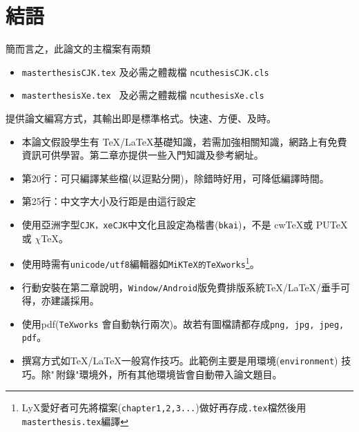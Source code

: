 \section{結語}
簡而言之，此論文的主檔案有兩類
\begin{itemize}
\item {\tt masterthesisCJK.tex} 及必需之體裁檔 {\tt ncuthesisCJK.cls}
\item {\tt masterthesisXe.tex } 及必需之體裁檔 {\tt ncuthesisXe.cls}
\end{itemize}
提供論文編寫方式，其輸出即是標準格式。快速、方便、及時。
\begin{itemize} \index{\TeX!\LaTeX}
\item 本論文假設學生有 \TeX/\LaTeX 基礎知識，若需加強相關知識，網路上有免費資訊可供學習。第二章亦提供一些入門知識及參考網址。 

\item 第20行：可只編譯某些檔(以逗點分開)，除錯時好用，可降低編譯時間。

\item 第25行：中文字大小及行距是由這行設定


\item 使用亞洲字型{\tt CJK，xeCJK}中文化且設定為楷書({\tt bkai})，不是 cw\TeX 或 PU\TeX 或 $\chi$\TeX。 

\item 使用時需有{\tt unicode/utf8}編輯器如{\tt MiKTeX的TeXworks}\footnote{LyX愛好者可先將檔案({\tt chapter1,2,3...})做好再存成{\tt .tex}檔然後用{\tt masterthesis.tex}編譯}。  \index{\TeX!\XeLaTeX}

\item {\color{red}行動安裝}在第二章說明，{\tt Window/Android}版免費排版系統\linebreak \TeX{}/\LaTeX{}/\XeLaTeX{}垂手可得，亦建議採用。 

\item 使用pdf ({\tt TeXworks} 會自動執行兩次)。故若有圖檔請都存成{\tt png, jpg, jpeg, pdf}。

\item 撰寫方式如\TeX/\LaTeX{}一般寫作技巧。此範例主要是用環境\linebreak({\tt environment}) 技巧。除"\,附錄"環境外，所有其他環境皆會自動帶入論文題目。\label{indpage}


\end{itemize}
